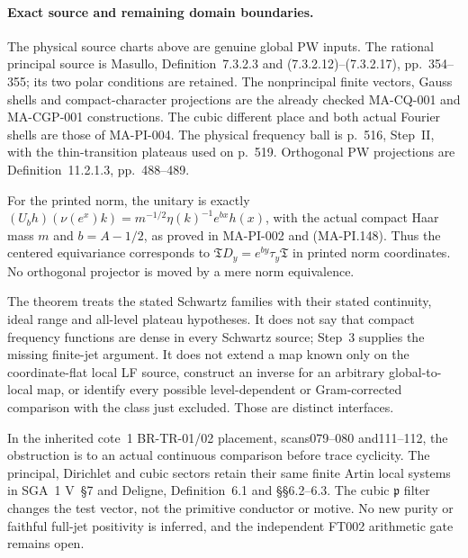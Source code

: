 \paragraph{Exact source and remaining domain boundaries.}
The physical source charts above are genuine global PW
inputs.  The rational principal source is Masullo,
Definition~7.3.2.3 and (7.3.2.12)--(7.3.2.17),
pp.~354--355; its two polar conditions are retained.
The nonprincipal finite vectors, Gauss shells and
compact-character projections are the already checked
MA-CQ-001 and MA-CGP-001 constructions.  The cubic
different place and both actual Fourier shells are
those of MA-PI-004.  The physical frequency ball is
p.~516, Step~II, with the thin-transition plateaus
used on p.~519.  Orthogonal PW projections are
Definition~11.2.1.3, pp.~488--489.

For the printed norm, the unitary is exactly
$(U_bh)(\nu(e^x)k)=m^{-1/2}\eta(k)^{-1}e^{bx}h(x)$,
with the actual compact Haar mass $m$ and $b=A-1/2$,
as proved in MA-PI-002 and (MA-PI.148).
Thus the centered equivariance corresponds to
$\mathfrak T D_y=e^{by}\tau_y\mathfrak T$ in printed
norm coordinates.  No orthogonal projector is moved
by a mere norm equivalence.

The theorem treats the stated Schwartz families with
their stated continuity, ideal range and all-level
plateau hypotheses.  It does not say that compact
frequency functions are dense in every Schwartz
source; Step~3 supplies the missing finite-jet argument.
It does not extend a map known only on the coordinate-flat
local LF source, construct an inverse for an arbitrary
global-to-local map, or identify every possible
level-dependent or Gram-corrected comparison with
the class just excluded.  Those are distinct interfaces.

In the inherited cote~1 BR-TR-01/02 placement,
scans079--080 and111--112, the obstruction is to an
actual continuous comparison before trace cyclicity.
The principal, Dirichlet and cubic sectors retain
their same finite Artin local systems in SGA~1 V~\S7
and Deligne, Definition~6.1 and \S\S6.2--6.3.
The cubic $\mathfrak p$ filter changes the test vector,
not the primitive conductor or motive.
No new purity or faithful full-jet positivity is inferred,
and the independent FT002 arithmetic gate remains open.

